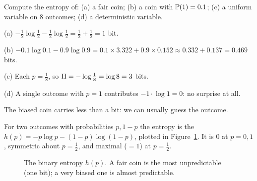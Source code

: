 \begin{example}\label{ex:shannon-values}
  Compute the entropy of: (a) a fair coin; (b) a coin with $\mathbb{P}(1)=0.1$; (c) a uniform variable on $8$ outcomes; (d) a deterministic variable.
\end{example}
\begin{solution}
  \begin{steps}
    \item (a) $-\tfrac12\log\tfrac12-\tfrac12\log\tfrac12=\tfrac12+\tfrac12=1$ bit.
    \item (b) $-0.1\log0.1-0.9\log0.9=0.1\times3.322+0.9\times0.152\approx0.332+0.137=0.469$ bits.
    \item (c) Each $p=\tfrac18$, so $\mathrm{H}=-\log\tfrac18=\log8=3$ bits.
    \item (d) A single outcome with $p=1$ contributes $-1\cdot\log1=0$: no surprise at all.
  \end{steps}
  The biased coin carries less than a bit: we can usually guess the outcome.
\end{solution}

For two outcomes with probabilities $p,1-p$ the entropy is the  $h(p)=-p\log p-(1-p)\log(1-p)$, plotted in Figure~\ref{fig:binary-entropy}. It is $0$ at $p=0,1$, symmetric about $p=\tfrac12$, and maximal ($=1$) at $p=\tfrac12$.

\begin{figure}[htb]
  \centering
  \caption{The binary entropy $h(p)$. A fair coin is the most unpredictable (one bit); a very biased one is almost predictable.}
  \label{fig:binary-entropy}
\end{figure}

